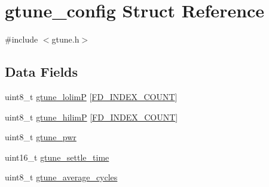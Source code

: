 \hypertarget{structgtune__config}{\section{gtune\+\_\+config Struct Reference}
\label{structgtune__config}
}


{\ttfamily \#include $<$gtune.\+h$>$}

\subsection*{Data Fields}
\begin{DoxyCompactItemize}
\item 
uint8\+\_\+t \hyperlink{structgtune__config_a4230665105ae8ae6059e4a276674d71f}{gtune\+\_\+lolim\+P} \mbox{[}\hyperlink{axis_8h_af5b0c350685b5d92e9590d8d9dc4cdc2a6b6b744ba6159ba4e79b4ae84ced18df}{F\+D\+\_\+\+I\+N\+D\+E\+X\+\_\+\+C\+O\+U\+N\+T}\mbox{]}
\item 
uint8\+\_\+t \hyperlink{structgtune__config_a054dc199c537327b017e2770e945600e}{gtune\+\_\+hilim\+P} \mbox{[}\hyperlink{axis_8h_af5b0c350685b5d92e9590d8d9dc4cdc2a6b6b744ba6159ba4e79b4ae84ced18df}{F\+D\+\_\+\+I\+N\+D\+E\+X\+\_\+\+C\+O\+U\+N\+T}\mbox{]}
\item 
uint8\+\_\+t \hyperlink{structgtune__config_ab1100384096858284c1740cbbc0f4050}{gtune\+\_\+pwr}
\item 
uint16\+\_\+t \hyperlink{structgtune__config_a952d643f00b12b8ba7e1f23088bccf39}{gtune\+\_\+settle\+\_\+time}
\item 
uint8\+\_\+t \hyperlink{structgtune__config_afcec62f1ae317dbfdcd5421067ed5e68}{gtune\+\_\+average\+\_\+cycles}
\end{DoxyCompactItemize}


